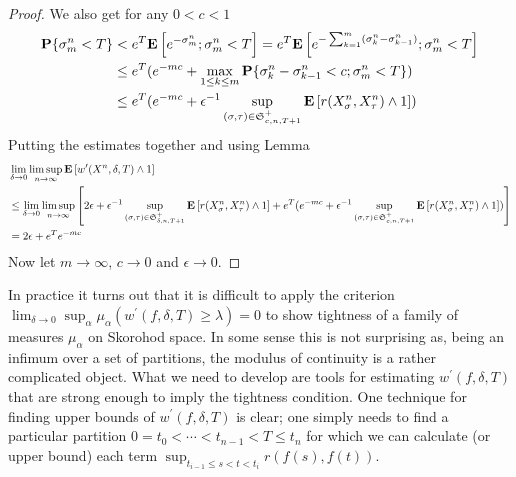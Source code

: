 \begin{proof}
We also get for any $0 < c < 1$ 
\begin{align*}
\textbf{P}\{\sigma^n_m < T\} &< e^T \textbf{E}\left[e^{-\sigma^n_m}; \sigma^n_m < T\right] = e^T \textbf{E}\left[e^{-\sum_{k=1}^m (\sigma^n_k-\sigma^n_{k-1})}; \sigma^n_m < T\right] \\
&\leq e^T (e^{-mc} + \max_{1 \leq k \leq m} \textbf{P}\{\sigma^n_k-\sigma^n_{k-1} < c ; \sigma^n_m < T\}) \\
&\leq e^T (e^{-mc} + \epsilon^{-1} \sup_{(\sigma, \tau) \in \mathfrak{S}^+_{c,n,T+1}} \textbf{E}\left[r(X^n_\sigma, X^n_\tau) \wedge 1\right])
\end{align*}
Putting the estimates together and using Lemma \label{AldousCriterionExponentialEstimate}
\begin{align*}
&\lim_{\delta \to 0} \limsup_{n \to \infty} \textbf{E}\left[w^\prime(X^n, \delta, T) \wedge 1\right] \\
&\leq \lim_{\delta \to 0} \limsup_{n \to \infty} \left[ 2 \epsilon + \epsilon^{-1} \sup_{(\sigma, \tau) \in \mathfrak{S}^+_{\delta,n,T+1}} \textbf{E}\left[r(X^n_\sigma, X^n_\tau) \wedge 1\right] + e^T (e^{-mc} + \epsilon^{-1} \sup_{(\sigma, \tau) \in \mathfrak{S}^+_{c,n,T+1}} \textbf{E}\left[r(X^n_\sigma, X^n_\tau) \wedge 1\right])\right] \\
&=2\epsilon + e^T e^{-mc}
\end{align*}
Now let $m \to \infty$, $c \to 0$ and $\epsilon \to 0$.
\end{proof}

In practice it turns out that it is difficult to apply the criterion $\lim_{\delta \to 0} \sup_{\alpha} \mu_\alpha( w^\prime(f, \delta, T) \geq \lambda) = 0$ to show tightness of a family of
measures $\mu_\alpha$ on Skorohod space.  In some sense this is not surprising as, being an infimum over a set of partitions, the modulus of continuity is a rather complicated object.  What we need to develop are tools for estimating $w^\prime(f, \delta, T)$ that are strong enough to imply the tightness condition.  One technique for finding upper bounds of $w^\prime(f, \delta, T)$ is clear; one simply needs to find a particular partition $0=t_0 < \dotsb < t_{n-1} < T \leq t_n$ for which we can calculate (or upper bound) each term $\sup_{t_{i-1} \leq s < t < t_i} r(f(s), f(t))$.  

